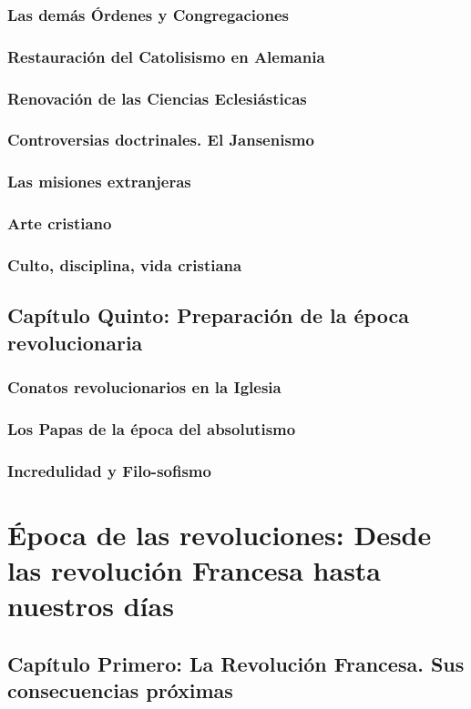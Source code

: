 \raggedbottom{} \documentclass[12pt, a4paper, openany]{book} %
\begin{document}
\section{Las demás Órdenes y Congregaciones}
\section{Restauración del Catolisismo en Alemania}
\section{Renovación de las Ciencias Eclesiásticas}
\section{Controversias doctrinales. El Jansenismo}
\section{Las misiones extranjeras}
\section{Arte cristiano}
\section{Culto, disciplina, vida cristiana}
\chapter{Capítulo Quinto: Preparación de la época revolucionaria}
\section{Conatos revolucionarios en la Iglesia}
\section{Los Papas de la época del absolutismo}
\section{Incredulidad y Filo-sofismo}
\part{Época de las revoluciones: Desde las revolución Francesa hasta nuestros días}
\chapter{Capítulo Primero: La Revolución Francesa. Sus consecuencias próximas}
\end{document}
